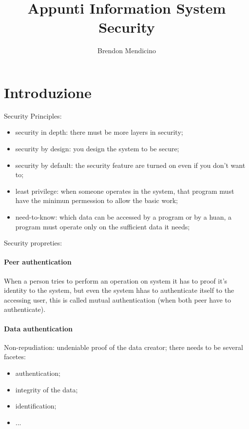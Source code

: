 \documentclass[12pt]{article}
\title{Appunti Information System Security}
\author{Brendon Mendicino}
\begin{document}
\maketitle
\newpage
\tableofcontents
\newpage


\section{Introduzione}\label{sec:introduzione}




Security Principles:
\begin{itemize}
    \item security in depth: there must be more layers in security;
    \item security by design: you design the system to be secure;
    \item security by default: the security feature are turned on even if you don't want to;
    \item least privilege: when someone operates in the system, that program must have the minimun permession to allow the basic work;
    \item need-to-know: which data can be accessed by a program or by a huan, a program must operate only on the sufficient data it needs;
\end{itemize}


Security propreties:

\paragraph{Peer authentication}
When a person tries to perform an operation on system it has to proof it's identity to the system, but even the system hhas to authenticate itself to the accessing user, this is called mutual authentication (when both peer have to authenticate).

\paragraph{Data authentication}
Non-repudiation: undeniable proof of the data creator; there needs to be several facetes:
\begin{itemize}
    \item authentication;
    \item integrity of the data;
    \item identification;
    \item ...
\end{itemize}
\end{document}
